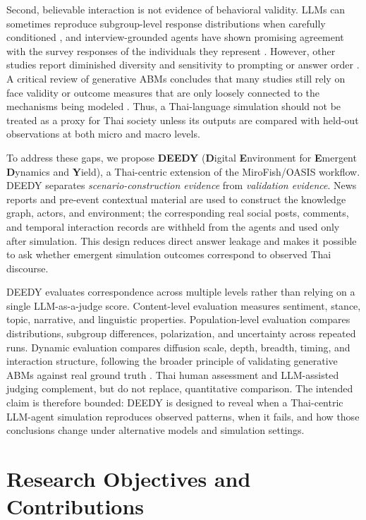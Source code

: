 \documentclass[10pt,twocolumn]{article}
\begin{document}
Second, believable interaction is not evidence of behavioral validity. LLMs
can sometimes reproduce subgroup-level response distributions when carefully
conditioned \citep{argyle2023out}, and interview-grounded agents have shown
promising agreement with the survey responses of the individuals they
represent \citep{park2024thousand}. However, other studies report diminished
diversity and sensitivity to prompting or answer order
\citep{park2024diversity}. A critical review of generative ABMs concludes that
many studies still rely on face validity or outcome measures that are only
loosely connected to the mechanisms being modeled
\citep{larooij2026validation}. Thus, a Thai-language simulation should not be
treated as a proxy for Thai society unless its outputs are compared with
held-out observations at both micro and macro levels.

To address these gaps, we propose \textbf{DEEDY} (\textbf{D}igital
\textbf{E}nvironment for \textbf{E}mergent \textbf{D}ynamics and
\textbf{Y}ield), a Thai-centric extension of the MiroFish/OASIS workflow.
DEEDY separates \emph{scenario-construction evidence} from
\emph{validation evidence}. News reports and pre-event contextual material are
used to construct the knowledge graph, actors, and environment; the
corresponding real social posts, comments, and temporal interaction records are
withheld from the agents and used only after simulation. This design reduces
direct answer leakage and makes it possible to ask whether emergent simulation
outcomes correspond to observed Thai discourse.

DEEDY evaluates correspondence across multiple levels rather than relying on a
single LLM-as-a-judge score. Content-level evaluation measures sentiment,
stance, topic, narrative, and linguistic properties. Population-level
evaluation compares distributions, subgroup differences, polarization, and
uncertainty across repeated runs. Dynamic evaluation compares diffusion scale,
depth, breadth, timing, and interaction structure, following the broader
principle of validating generative ABMs against real ground truth
\citep{gao2024survey,yang2024oasis}. Thai human assessment and LLM-assisted
judging complement, but do not replace, quantitative comparison. The intended
claim is therefore bounded: DEEDY is designed to reveal when a Thai-centric
LLM-agent simulation reproduces observed patterns, when it fails, and how
those conclusions change under alternative models and simulation settings.

\section{Research Objectives and Contributions}
\label{sec:objectives}
\end{document}
